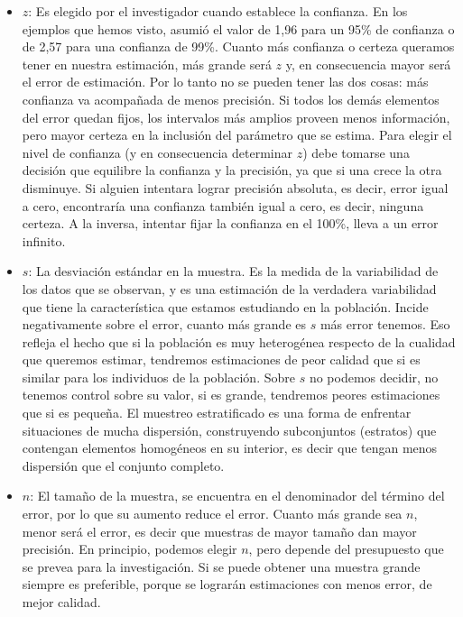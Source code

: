 \documentclass[]{book}
\begin{document}
\begin{itemize}
\item
  \(z\): Es elegido por el investigador cuando establece la confianza. En los ejemplos que hemos visto, asumió el valor de 1,96 para un 95\% de confianza o de 2,57 para una confianza de 99\%. Cuanto más confianza o certeza queramos tener en nuestra estimación, más grande será \(z\) y, en consecuencia mayor será el error de estimación. Por lo tanto no se pueden tener las dos cosas: más confianza va acompañada de menos precisión. Si todos los demás elementos del error quedan fijos, los intervalos más amplios proveen menos información, pero mayor certeza en la inclusión del parámetro que se estima. Para elegir el nivel de confianza (y en consecuencia determinar \(z\)) debe tomarse una decisión que equilibre la confianza y la precisión, ya que si una crece la otra disminuye. Si alguien intentara lograr precisión absoluta, es decir, error igual a cero, encontraría una confianza también igual a cero, es decir, ninguna certeza. A la inversa, intentar fijar la confianza en el 100\%, lleva a un error infinito.
\item
  \(s\): La desviación estándar en la muestra. Es la medida de la variabilidad de los datos que se observan, y es una estimación de la verdadera variabilidad que tiene la característica que estamos estudiando en la población. Incide negativamente sobre el error, cuanto más grande es \(s\) más error tenemos. Eso refleja el hecho que si la población es muy heterogénea respecto de la cualidad que queremos estimar, tendremos estimaciones de peor calidad que si es similar para los individuos de la población. Sobre \(s\) no podemos decidir, no tenemos control sobre su valor, si es grande, tendremos peores estimaciones que si es pequeña. El muestreo estratificado es una forma de enfrentar situaciones de mucha dispersión, construyendo subconjuntos (estratos) que contengan elementos homogéneos en su interior, es decir que tengan menos dispersión que el conjunto completo.
\item
  \(n\): El tamaño de la muestra, se encuentra en el denominador del término del error, por lo que su aumento reduce el error. Cuanto más grande sea \(n\), menor será el error, es decir que muestras de mayor tamaño dan mayor precisión. En principio, podemos elegir \(n\), pero depende del presupuesto que se prevea para la investigación. Si se puede obtener una muestra grande siempre es preferible, porque se lograrán estimaciones con menos error, de mejor calidad.
\end{itemize}
\end{document}
